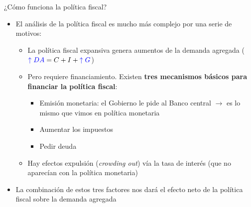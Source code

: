 \documentclass{beamer}
\begin{document}
\begin{frame}{¿Cómo funciona la política fiscal?}
    \begin{itemize}
        \item El análisis de la política fiscal es mucho más complejo por una serie de motivos:
        \begin{itemize}
            \item La política fiscal expansiva genera aumentos de la demanda agregada ($\textcolor{blue}{\uparrow DA}= C+ I+ \textcolor{blue}{\uparrow G}$)
            \vspace{1mm}
            \item Pero requiere financiamiento. Existen \textbf{tres mecanismos básicos para financiar la política fiscal}:
        \begin{itemize}
            \item Emisión monetaria: el Gobierno le pide al Banco central $\rightarrow$ es lo mismo que vimos en política monetaria 
            \item Aumentar los impuestos
            \item Pedir deuda
        \end{itemize}
             \vspace{0.5mm}
            \item Hay efectos expulsión (\textit{crowding out}) vía la tasa de interés (que no aparecían con la política monetaria)
        \end{itemize}
        \vspace{1mm}
        \item La combinación de estos tres factores nos dará el efecto neto de la política fiscal sobre la demanda agregada
    \end{itemize}
\end{frame}
\end{document}
